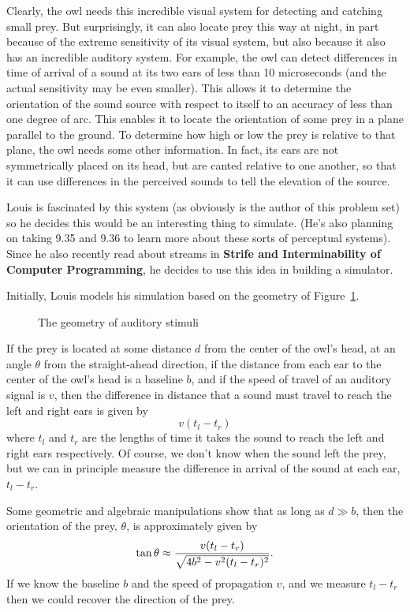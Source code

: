 Clearly, the owl needs this
incredible visual system for detecting  and catching small prey.  But
surprisingly, it can also locate prey this way at night, in part because of the
extreme sensitivity of its visual system, but also because it also has
an incredible auditory system.  For example, the owl can detect
differences in time of arrival of a sound at its two ears of less than
10 microseconds (and the actual sensitivity may be even smaller). This
allows it to determine the orientation of the sound source with respect
to itself to an accuracy of less than one degree of arc.  This enables it
to locate the orientation of some prey in a  plane parallel to the
ground.   To determine how high or low the prey is relative to that
plane, the owl needs some other information.  In fact, its ears are not
symmetrically placed on its head, but are canted relative to one
another, so that it can use differences in the perceived sounds to tell
the elevation of the source.

Louis is fascinated by this system (as obviously is the author of this
problem set) so he decides this would be an interesting thing to
simulate. (He's also planning on taking 9.35 and 9.36 to learn more about
these sorts of perceptual systems). Since
he also recently read about streams in {\bf Strife and Interminability of
Computer Programming}, he decides to use this idea in building a
simulator.

Initially, Louis models his simulation based on the geometry of
Figure~\ref{fig:geometry}.

\begin{figure}[hbt]
\vskip 2in
\caption{The geometry of auditory stimuli}\label{fig:geometry}
\end{figure}

If the prey is located at some distance $d$ from the center of the owl's
head, at an angle $\theta$ from the straight-ahead direction,  if the
distance from each ear to the center of the owl's head is a baseline
$b$, and if the speed of travel of an auditory signal is $v$, then the
difference in distance that a sound must travel to reach the left and
right ears is given by 
\[v (t_l - t_r)\]
where $t_l$ and $t_r$ are the lengths of time it takes the sound to
reach the left and right ears respectively.  Of course, we don't know
when the sound left the prey, but we can in principle measure the
difference in arrival of the sound at each ear, $t_l -t_r$.

Some
geometric and algebraic manipulations show that as long as $d \gg b$,
then the orientation of the 
prey, $\theta$, is approximately given by
\[\tan\theta \approx {{v(t_l - t_r)} \over{\sqrt{4b^2 - v^2(t_l -
t_r)^2}}}.\]
If we know the baseline $b$ and the speed of propagation $v$, and we
measure $t_l-t_r$ then we could recover the direction of the prey.


